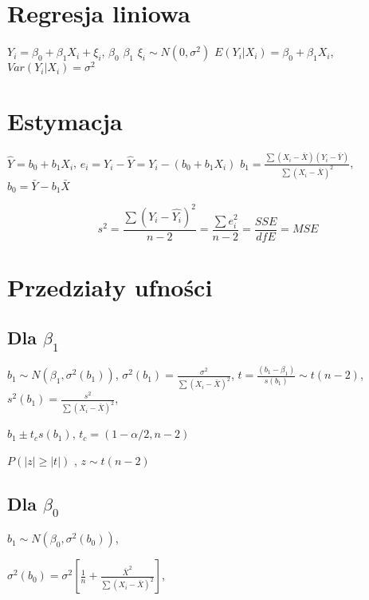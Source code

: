 \documentclass[9pt]{article}  %
\begin{document}

\section{Regresja liniowa}

  $Y_i = \beta_0 + \beta_1 X_i + \xi_i$, $\beta_0$ $\beta_1$ $\xi_i \sim N \left(0, \sigma^2 \right)$ $E(Y_i | X_i) = \beta_0 + \beta_1 X_i$, $Var(Y_i | X_i) = \sigma^2$
  
  
\section{Estymacja}


  $\hat{Y} = b_0 + b_1 X_i$, $e_i = Y_i - \hat{Y} = Y_i - (b_0 + b_1 X_i)$
  $
  b_1 = \frac{\sum{\left(X_i - \bar{X} \right) \left( Y_i - \bar{Y} \right) } }{\sum{\left(X_i - \bar{X} \right) ^2 } }
  $, $
  b_0 = \bar{Y} - b_1 \bar{X}
  $
  
  
    $$ s^2 = \frac{ \sum{ \left( Y_i - \hat{Y_i} \right)^2 } } { n-2 }  = \frac{ \sum{e^2_i}  }{n-2} = \frac{SSE}{dfE} = MSE$$
  
  
  
  \section{Przedziały ufności}
  
    \subsection{ Dla $\beta_1$ }
    
    $b_1 \sim N(\beta_1, \sigma^2(b_1)) $, 
    $\sigma^2(b_1) = \frac{\sigma^2}{\sum{\left(X_i - \bar{X}\right)^2 }}$, 
    $ t = \frac{ \left(b_1 - \beta_1 \right) }{ s(b_1) } \sim t(n-2)$, 
    $s^2(b_1) = \frac{s^2}{\sum{\left(X_i - \bar{X}\right)^2}}$, 


    $ b_1 \pm t_c s(b_1)$, 
    $ t_c = (1-\alpha /2, n-2)$


    $P(|z| \ge |t|)$ , $z \sim t(n-2)$ \newline
    
    
    \subsection{ Dla $\beta_0$ }
    
      $b_1 \sim N(\beta_0, \sigma^2(b_0)) $, 
    
    $\sigma^2(b_0) = \sigma^2 \left[ \frac{1}{n} + \frac{\bar{X}^2}{\sum{\left(X_i - \bar{X}\right)^2 }}  \right]$, 
\end{document}

